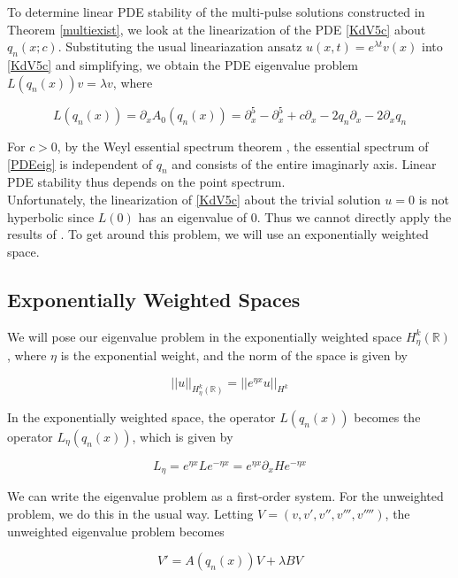\documentclass[12pt]{article}
\def\R{{\mathbb R}}
\begin{document}
To determine linear PDE stability of the multi-pulse solutions constructed in Theorem \ref{multiexist}, we look at the linearization of the PDE \eqref{KdV5c} about $q_n(x; c)$. Substituting the usual lineariazation ansatz $u(x, t) = e^{\lambda t} v(x)$ into \eqref{KdV5c} and simplifying, we obtain the PDE eigenvalue problem $L(q_n(x)) v = \lambda v$, where

\begin{equation}\label{PDEeig}
L(q_n(x)) = \partial_x A_0(q_n(x)) = \partial_x^5 - \partial_x^5 + c \partial_x - 2 q_n \partial_x - 2 \partial_x q_n  
\end{equation}

For $c > 0$, by the Weyl essential spectrum theorem \cite[Theorem 2.2.6]{Kapitula2013}, the essential spectrum of \eqref{PDEeig} is independent of $q_n$ and consists of the entire imaginarly axis. Linear PDE stability thus depends on the point spectrum. \\

Unfortunately, the linearization of \eqref{KdV5c} about the trivial solution $u = 0$ is not hyperbolic since $L(0)$ has an eigenvalue of 0. Thus we cannot directly apply the results of \cite{Sandstede1998}. To get around this problem, we will use an exponentially weighted space.

\subsection{Exponentially Weighted Spaces}\label{sec:expwt}

We will pose our eigenvalue problem in the exponentially weighted space $H_\eta^k(\R)$, where $\eta$ is the exponential weight, and the norm of the space is given by

\[
||u||_{H_\eta^k(\R)} = ||e^{\eta x}u||_{H^k}
\]

In the exponentially weighted space, the operator $L(q_n(x))$ becomes the operator $L_\eta(q_n(x))$, which is given by

\begin{equation}\label{Leta}
L_\eta = e^{\eta x} L e^{-\eta x} = e^{\eta x} \partial_x H e^{-\eta x}
\end{equation}

We can write the eigenvalue problem as a first-order system. For the unweighted problem, we do this in the usual way. Letting $V = (v, v', v'', v''', v'''')$, the unweighted eigenvalue problem becomes

\[
V' = A(q_n(x))V + \lambda B V
\]
\end{document}
